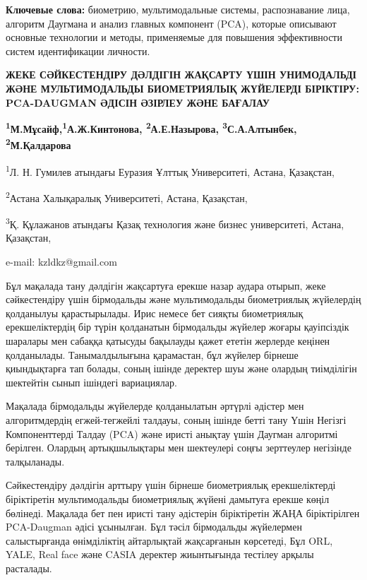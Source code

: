 {\bfseries Ключевые слова:} биометрию, мультимодальные системы,
распознавание лица, алгоритм Даугмана и анализ главных компонент (PCA),
которые описывают основные технологии и методы, применяемые для
повышения эффективности систем идентификации личности.

\begin{center}
{\large\bfseries ЖЕКЕ СӘЙКЕСТЕНДІРУ ДӘЛДІГІН ЖАҚСАРТУ ҮШІН УНИМОДАЛЬДІ ЖӘНЕ
МУЛЬТИМОДАЛЬДЫ БИОМЕТРИЯЛЫҚ ЖҮЙЕЛЕРДІ БІРІКТІРУ: PCA-DAUGMAN ӘДІСІН
ӘЗІРЛЕУ ЖӘНЕ БАҒАЛАУ}

{\bfseries \textsuperscript{1}М.Мұсайф,\textsuperscript{1}А.Ж.Кинтонова,
\textsuperscript{2}А.Е.Назырова, \textsuperscript{3}С.А.Алтынбек,
\textsuperscript{2}М.Қалдарова}

\textsuperscript{1}Л. Н. Гумилев атындағы Еуразия Ұлттық Университеті,
Астана, Қазақстан,

\textsuperscript{2}Астана Халықаралық Университеті, Астана, Қазақстан,

\textsuperscript{3}Қ. Құлажанов атындағы Қазақ технология және бизнес
университеті, Астана, Қазақстан,

e-mail: kzldkz@gmail.com
\end{center}

Бұл мақалада тану дәлдігін жақсартуға ерекше назар аудара отырып, жеке
сәйкестендіру үшін бірмодальды және мультимодальды биометриялық
жүйелердің қолданылуы қарастырылады. Ирис немесе бет сияқты биометриялық
ерекшеліктердің бір түрін қолданатын бірмодальды жүйелер жоғары
қауіпсіздік шаралары мен сабаққа қатысуды бақылауды қажет ететін
жерлерде кеңінен қолданылады. Танымалдылығына қарамастан, бұл жүйелер
бірнеше қиындықтарға тап болады, соның ішінде деректер шуы және олардың
тиімділігін шектейтін сынып ішіндегі вариациялар.

Мақалада бірмодальды жүйелерде қолданылатын әртүрлі әдістер мен
алгоритмдердің егжей-тегжейлі талдауы, соның ішінде бетті тану Үшін
Негізгі Компоненттерді Талдау (PCA) және иристі анықтау үшін Даугман
алгоритмі берілген. Олардың артықшылықтары мен шектеулері соңғы
зерттеулер негізінде талқыланады.

Сәйкестендіру дәлдігін арттыру үшін бірнеше биометриялық ерекшеліктерді
біріктіретін мультимодальды биометриялық жүйені дамытуға ерекше көңіл
бөлінеді. Мақалада бет пен иристі тану әдістерін біріктіретін ЖАҢА
біріктірілген PCA-Daugman әдісі ұсынылған. Бұл тәсіл бірмодальды
жүйелермен салыстырғанда өнімділіктің айтарлықтай жақсарғанын көрсетеді,
Бұл ORL, YALE, Real face және CASIA деректер жиынтығында тестілеу арқылы
расталады.

